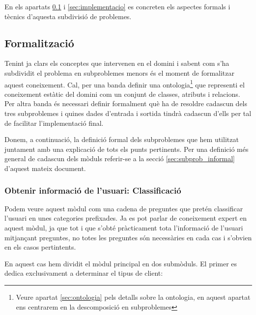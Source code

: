 \documentclass[11pt,a4paper]{article}
\begin{document}
En els apartats \ref{sec:formalitzacio} i \ref{sec:implementacio} es concreten els aspectes formals i tècnics d'aquesta subdivisió de problemes.


\subsection{Formalització}
\label{sec:formalitzacio}
Tenint ja clars els conceptes que intervenen en el domini i sabent com s'ha subdividit el problema en subproblemes menors és el moment de formalitzar aquest coneixement. Cal, per una banda definir una ontologia\footnote{Veure apartat \ref{sec:ontologia} pels detalls sobre la ontologia, en aquest apartat ens centrarem en la descomposició en subproblemes} que representi el coneixement estàtic del domini com un conjunt de classes, atributs i relacions. Per altra banda és necessari definir formalment què ha de resoldre cadascun dels tres subproblemes i quines dades d'entrada i sortida tindrà cadascun d'ells per tal de facilitar l'implementació final.

Donem, a continuació, la definició formal dels subproblemes que hem utilitzat juntament amb una explicació de tots els punts pertinents. Per una definició més general de cadascun dels mòduls referir-se a la secció \ref{sec:subprob_informal} d'aquest mateix document.

\subsubsection*{Obtenir informació de l'usuari: Classificació}

Podem veure aquest mòdul com una cadena de preguntes que pretén classificar l'usuari en unes categories prefixades. Ja es pot parlar de coneixement expert en aquest mòdul, ja que tot i que s'obté pràcticament tota l'informació de l'usuari mitjançant preguntes, no totes les preguntes són necessàries en cada cas i s'obvien en els casos pertintents.

En aquest cas hem dividit el mòdul principal en dos submòduls. El primer es dedica exclusivament a determinar el tipus de client:
\end{document}
